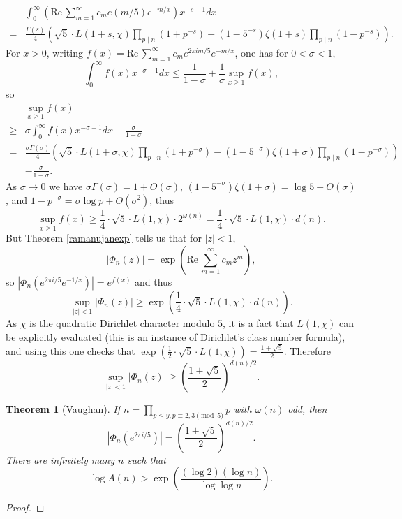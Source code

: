 \documentclass{amsart}
\def\Re{\ensuremath{\mathrm{Re}}\,}
\newtheorem{theorem}{Theorem}
\theoremstyle{definition}
\begin{document}
\[
\begin{split}
&\int_0^\infty \left( \Re \sum_{m=1}^\infty c_m e(m/5) e^{-m/x} \right) x^{-s-1} dx\\
=&\frac{\Gamma(s)}{4} \left( \sqrt{5} \cdot L(1+s,\chi)  \prod_{p \mid n} (1+p^{-s})
-(1- 5^{-s}) \zeta(1+s)   \prod_{p \mid n} (1-p^{-s}) \right).
\end{split}
\]
For $x>0$, writing $f(x) = \Re \sum_{m=1}^\infty c_m e^{2\pi im/5} e^{-m/x}$,
one has for $0<\sigma<1$,
\[
\int_0^\infty f(x) x^{-\sigma-1} dx \leq \frac{1}{1-\sigma} +  \frac{1}{\sigma} \sup_{x \geq 1} f(x),
\]
so
\[
\begin{split}
&\sup_{x \geq 1} f(x)\\
\geq &\sigma \int_0^\infty f(x) x^{-\sigma-1} dx - \frac{\sigma}{1-\sigma}\\
=&\frac{\sigma\Gamma(\sigma)}{4} \left( \sqrt{5} \cdot L(1+\sigma,\chi)  \prod_{p \mid n} (1+p^{-\sigma})
-(1- 5^{-\sigma}) \zeta(1+\sigma)   \prod_{p \mid n} (1-p^{-\sigma}) \right)\\
& - \frac{\sigma}{1-\sigma}.
\end{split}
\]
As $\sigma \to 0$ we have $\sigma \Gamma(\sigma) = 1+O(\sigma)$, $(1-5^{-\sigma})\zeta(1+\sigma) = \log 5 + O(\sigma)$, and
$1-p^{-\sigma} = \sigma \log p+O(\sigma^2)$, thus
\[
\sup_{x \geq 1} f(x) \geq \frac{1}{4} \cdot \sqrt{5} \cdot L(1,\chi) \cdot 2^{\omega(n)}= \frac{1}{4} \cdot \sqrt{5} \cdot L(1,\chi) \cdot d(n).
\]
But  Theorem \ref{ramanujanexp} tells us that for $|z|<1$,
\[
|\Phi_n(z)| = \exp\left( \Re \sum_{m=1}^\infty c_m z^m\right),
\]
so $|\Phi_n(e^{2\pi i/5} e^{-1/x})| = e^{f(x)}$ and thus
\[
\sup_{|z|<1} |\Phi_n(z)| \geq \exp\left( \frac{1}{4} \cdot \sqrt{5} \cdot L(1,\chi) \cdot d(n) \right).
\]
As $\chi$ is the quadratic Dirichlet character modulo $5$, it is a fact that
$L(1,\chi)$ can be explicitly evaluated (this is an instance of Dirichlet's class number formula),
and using this one checks
that $\exp\left( \frac{1}{2} \cdot \sqrt{5} \cdot L(1,\chi)\right) = \frac{1+\sqrt{5}}{2}$.
Therefore
\[
\sup_{|z|<1} |\Phi_n(z)| \geq \left( \frac{1+\sqrt{5}}{2}\right)^{d(n)/2}.
\]


\begin{theorem}[Vaughan]
If $n=\prod_{p \leq y, p \equiv 2,3 \pmod{5}} p$ with $\omega(n)$  odd, then
\[
|\Phi_n(e^{2\pi i/5})| = \left( \frac{1+\sqrt{5}}{2} \right)^{d(n)/2}.
\]
There are infinitely many $n$ such that 
\[
\log A(n) > \exp\left( \frac{(\log 2)(\log n)}{\log \log n}\right).
\]
\end{theorem}
\begin{proof}


\end{proof}
\end{document}

